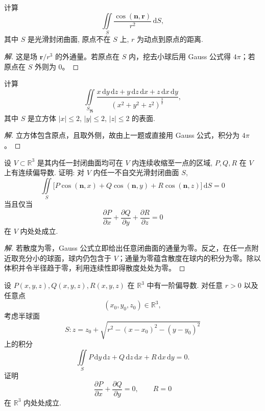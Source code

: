 \documentclass[../../数学分析培优讲义(答案版).tex]{subfiles}
\begin{document}
\begin{example}
计算
\[
    \iint\limits_S\dfrac{\cos(\bm n,\bm r)}{r^2}\,\mathrm{d}S,
\]
其中 $S$ 是光滑封闭曲面, 原点不在 $S$ 上, $r$ 为动点到原点的距离.
\end{example}

\begin{proof}[解]
这是场 $\bm r/r^3$ 的外通量。若原点在 $S$ 内，挖去小球后用 Gauss 公式得 $4\pi$；若原点在 $S$ 外则为 $0$。
\end{proof}

\begin{example}
计算
\[
    \iint\limits_{S_{\text{外}}}\dfrac{x\,\mathrm{d}y\,\mathrm{d}z+y\,\mathrm{d}z\,\mathrm{d}x+z\,\mathrm{d}x\,\mathrm{d}y}{(x^2+y^2+z^2)^{\frac{3}{2}}},
\]
其中 $S$ 是立方体 $|x|\leq2$, $|y|\leq2$, $|z|\leq2$ 的表面.
\end{example}

\begin{proof}[解]
立方体包含原点，且取外侧，故由上一题或直接用 Gauss 公式，积分为 $4\pi$。
\end{proof}

\begin{example}
设 $V\subset\mathbb{R}^3$ 是其内任一封闭曲面均可在 $V$ 内连续收缩至一点的区域, $P,Q,R$ 在 $V$ 上有连续偏导数. 证明: 对 $V$ 内任一不自交光滑封闭曲面 $S$,
\[
    \iint\limits_S\bigl\lbrack P\cos(\bm n,x)+Q\cos(\bm n,y)+R\cos(\bm n,z)\bigr\rbrack\,\mathrm{d}S=0
\]
当且仅当
\[
    \dfrac{\partial P}{\partial x}+\dfrac{\partial Q}{\partial y}+\dfrac{\partial R}{\partial z}=0
\]
在 $V$ 内处处成立.
\end{example}

\begin{proof}[解]
若散度为零，Gauss 公式立即给出任意闭曲面的通量为零。反之，在任一点附近取充分小的球面，球内仍包含于 $V$；通量为零蕴含散度在球内的积分为零。除以体积并令半径趋于零，利用连续性即得散度处处为零。
\end{proof}

\begin{example}
设 $P(x,y,z),Q(x,y,z),R(x,y,z)$ 在 $\mathbb{R}^3$ 中有一阶偏导数. 对任意 $r>0$ 以及任意点
\[
    (x_0,y_0,z_0)\in\mathbb{R}^3,
\]
考虑半球面
\[
    S:z=z_0+\sqrt{r^2-(x-x_0)^2-(y-y_0)^2}
\]
上的积分
\[
    \iint\limits_S
    P\,\mathrm{d}y\,\mathrm{d}z
    +Q\,\mathrm{d}z\,\mathrm{d}x
    +R\,\mathrm{d}x\,\mathrm{d}y=0.
\]
证明
\[
    \dfrac{\partial P}{\partial x}+\dfrac{\partial Q}{\partial y}=0,
    \qquad R=0
\]
在 $\mathbb{R}^3$ 内处处成立.
\end{example}
\end{document}
